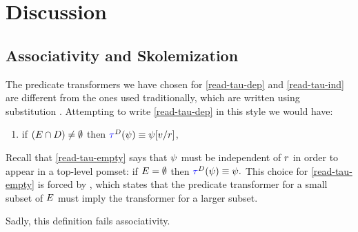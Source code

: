 \section{Discussion}
\label{sec:discussion}

\subsection{Associativity and Skolemization}
\label{sec:ex:assoc}

The predicate transformers we have chosen for \ref{read-tau-dep} and
\ref{read-tau-ind} are different from the ones used traditionally, which are
written using substitution \jjr{}.  Attempting to write \ref{read-tau-dep} in
this style we would have:
\begin{enumerate}[topsep=0pt]
\item[{\labeltext[\textsc{r}4a$'$]{(\textsc{r}4a$'$)}{read-tau-dep-p}}]
  if $(E\cap D)\neq\emptyset$ then
  \begin{math}
    \aTr{\bEvs}{\bForm} \riff    
    \bForm[\aVal/\aReg]
  \end{math},    
\end{enumerate}
Recall that \ref{read-tau-empty} says that $\psi$ must be independent of
$r$ in order to appear in a top-level pomset: if $E=\emptyset$ then
\begin{math}
  \aTr{\bEvs}{\bForm} \riff
  \bForm.
\end{math}
This choice for \ref{read-tau-empty} is forced by , which
states that the predicate transformer for a small subset of $E$ must
imply the transformer for a larger subset.

Sadly, this definition fails associativity.

